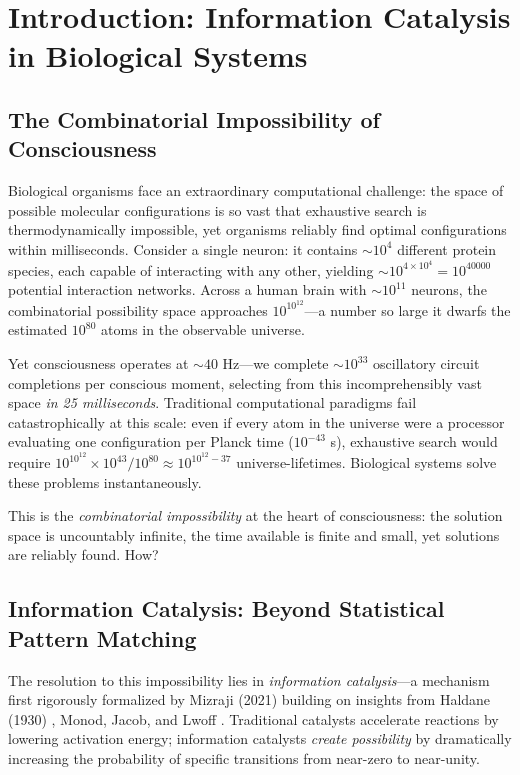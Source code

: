 \section{Introduction: Information Catalysis in Biological Systems}

\subsection{The Combinatorial Impossibility of Consciousness}

Biological organisms face an extraordinary computational challenge: the space of possible molecular configurations is so vast that exhaustive search is thermodynamically impossible, yet organisms reliably find optimal configurations within milliseconds. Consider a single neuron: it contains $\sim 10^4$ different protein species, each capable of interacting with any other, yielding $\sim 10^{4 \times 10^4} = 10^{40000}$ potential interaction networks. Across a human brain with $\sim 10^{11}$ neurons, the combinatorial possibility space approaches $10^{10^{12}}$—a number so large it dwarfs the estimated $10^{80}$ atoms in the observable universe.

Yet consciousness operates at $\sim 40$ Hz—we complete $\sim 10^{33}$ oscillatory circuit completions per conscious moment, selecting from this incomprehensibly vast space \textit{in 25 milliseconds}. Traditional computational paradigms fail catastrophically at this scale: even if every atom in the universe were a processor evaluating one configuration per Planck time ($10^{-43}$ s), exhaustive search would require $10^{10^{12}} \times 10^{43} / 10^{80} \approx 10^{10^{12}-37}$ universe-lifetimes. Biological systems solve these problems instantaneously.

This is the \textit{combinatorial impossibility} at the heart of consciousness: the solution space is uncountably infinite, the time available is finite and small, yet solutions are reliably found. How?

\subsection{Information Catalysis: Beyond Statistical Pattern Matching}

The resolution to this impossibility lies in \textit{information catalysis}—a mechanism first rigorously formalized by Mizraji (2021) \cite{mizraji2021biological} building on insights from Haldane (1930) \cite{haldane1930enzymes}, Monod, Jacob, and Lwoff \cite{monod1971chance,jacob1970logic}. Traditional catalysts accelerate reactions by lowering activation energy; information catalysts \textit{create possibility} by dramatically increasing the probability of specific transitions from near-zero to near-unity.

